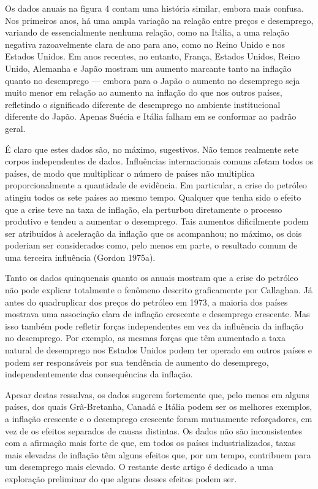 \documentclass[12pt]{article}
\begin{document}
Os dados anuais na figura 4 contam uma história similar, embora mais confusa. Nos primeiros anos, há uma ampla variação na relação entre preços e desemprego, variando de essencialmente nenhuma relação, como na Itália, a uma relação negativa razoavelmente clara de ano para ano, como no Reino Unido e nos Estados Unidos. Em anos recentes, no entanto, França, Estados Unidos, Reino Unido, Alemanha e Japão mostram um aumento marcante tanto na inflação quanto no desemprego — embora para o Japão o aumento no desemprego seja muito menor em relação ao aumento na inflação do que nos outros países, refletindo o significado diferente de desemprego no ambiente institucional diferente do Japão. Apenas Suécia e Itália falham em se conformar ao padrão geral.

É claro que estes dados são, no máximo, sugestivos. Não temos realmente sete corpos independentes de dados. Influências internacionais comuns afetam todos os países, de modo que multiplicar o número de países não multiplica proporcionalmente a quantidade de evidência. Em particular, a crise do petróleo atingiu todos os sete países ao mesmo tempo. Qualquer que tenha sido o efeito que a crise teve na taxa de inflação, ela perturbou diretamente o processo produtivo e tendeu a aumentar o desemprego. Tais aumentos dificilmente podem ser atribuídos à aceleração da inflação que os acompanhou; no máximo, os dois poderiam ser considerados como, pelo menos em parte, o resultado comum de uma terceira influência (Gordon 1975a).

Tanto os dados quinquenais quanto os anuais mostram que a crise do petróleo não pode explicar totalmente o fenômeno descrito graficamente por Callaghan. Já antes do quadruplicar dos preços do petróleo em 1973, a maioria dos países mostrava uma associação clara de inflação crescente e desemprego crescente. Mas isso também pode refletir forças independentes em vez da influência da inflação no desemprego. Por exemplo, as mesmas forças que têm aumentado a taxa natural de desemprego nos Estados Unidos podem ter operado em outros países e podem ser responsáveis por sua tendência de aumento do desemprego, independentemente das consequências da inflação.

Apesar destas ressalvas, os dados sugerem fortemente que, pelo menos em alguns países, dos quais Grã-Bretanha, Canadá e Itália podem ser os melhores exemplos, a inflação crescente e o desemprego crescente foram mutuamente reforçadores, em vez de os efeitos separados de causas distintas. Os dados não são inconsistentes com a afirmação mais forte de que, em todos os países industrializados, taxas mais elevadas de inflação têm alguns efeitos que, por um tempo, contribuem para um desemprego mais elevado. O restante deste artigo é dedicado a uma exploração preliminar do que alguns desses efeitos podem ser.
\end{document}
